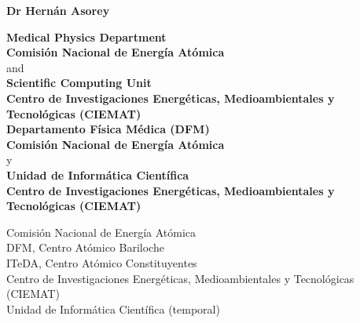\begin{center}{\huge \bf Dr Hernán Asorey}\\[0.8cm]\end{center}

\begin{center}
\ifeng
	{\textbf{Medical Physics Department}}\\
	{\textbf{Comisión Nacional de Energía Atómica}}\\
	and \\
	{\textbf{Scientific Computing Unit}}\\
	{\textbf{Centro de Investigaciones Energéticas, Medioambientales y Tecnológicas (CIEMAT)}}\\

\else
	{\textbf{Departamento Física Médica (DFM)}}\\
	{\textbf{Comisión Nacional de Energía Atómica}}\\
	y \\
	{\textbf{Unidad de Informática Científica}}\\
	{\textbf{Centro de Investigaciones Energéticas, Medioambientales y Tecnológicas (CIEMAT)}}\\
\fi
\end{center}
\begin{minipage}[t]{0.60\textwidth}
	Comisión Nacional de Energía Atómica\\
	\hspace*{1em}DFM, Centro Atómico Bariloche\\
	\hspace*{1em}ITeDA, Centro Atómico Constituyentes\\
 	Centro de Investigaciones Energéticas, Medioambientales y Tecnológicas (CIEMAT)\\
	\hspace*{1em}Unidad de Informática Científica (temporal)\\
\end{minipage}\hspace*{0.02\textwidth}
